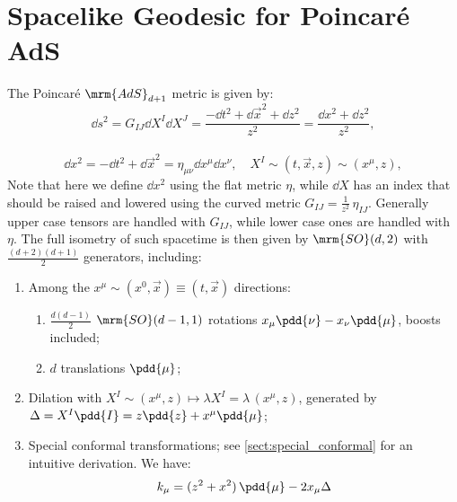 \documentclass[a4paper,10pt]{article}
\begin{document}
\section{Spacelike Geodesic for Poincar\'e AdS}
	The Poincar\'e $\mrm{AdS}_{d+1}$ metric is given by:
	\begin{equation}
		\dd{s}^2
		= G_{IJ} \dd{X^I} \dd{X^J}
		= \frac{
				-\dd{t}^2 + \dd{\vec{x}}^2 + \dd{z}^2
			}{z^2}
		= \frac{
				\dd{x}^2 + \dd{z}^2
			}{z^2},
	\end{equation}
	\\[-1.8\baselineskip]
	\begin{equation}
		\dd{x}^2
		= -\dd{t}^2 + \dd{\vec{x}}^2
		= \eta_{\mu\nu} \dd{x}^\mu \dd{x}^\nu,
	\quad
		X^I \sim (t,\vec{x},z)
		\sim (x^\mu, z),
	\end{equation}
	Note that here we define $\dd{x}^2$ using the flat metric $\eta$, while $\dd{X}$ has an index that should be raised and lowered using the curved metric $G_{IJ} = \frac{1}{z^2}\,\eta_{IJ}$. Generally upper case tensors are handled with $G_{IJ}$, while lower case ones are handled with $\eta$. 
	The full isometry of such spacetime is then given by $\mrm{SO}(d,2)$ with $\frac{(d+2)(d+1)}{2}$ generators, including:
	\begin{enumerate}[noitemsep]
	\item Among the $x^\mu \sim (x^0,\vec{x}) \equiv (t,\vec{x})$ directions:
		\begin{enumerate}[noitemsep,topsep=.5\baselineskip]
		\item $\frac{d(d-1)}{2}$ $\mrm{SO}(d-1,1)$ rotations $
			x_\mu \pdd{\nu} - x_\nu \pdd{\mu}
		$, boosts included;
		\item $d$ translations $\pdd{\mu}$;
		\end{enumerate}
	\item Dilation with $X^I \sim (x^\mu,z)\mapsto \lambda X^I = \lambda\,(x^\mu,z)$, generated by $\Delta = X^I \pdd{I} = z\pdd{z} + x^\mu \pdd{\mu}$;
	\item Special conformal transformations; see \autoref{sect:special_conformal} for an intuitive derivation. We have: 
	\begin{equation}
		k_\mu
		= (z^2 + x^2)\,\pdd{\mu}
			- 2x_\mu \Delta
	\end{equation}
	\end{enumerate}
	
\end{document}
